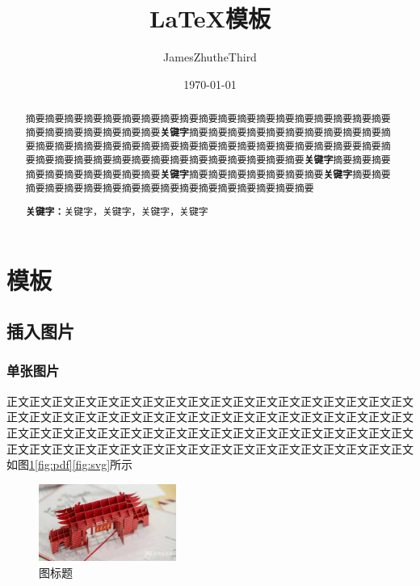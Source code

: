 \documentclass[a4paper]{article}
\title{\LaTeX 模板}
\author{JamesZhutheThird}
\date{\today}
\begin{document}
\thispagestyle{fancy}
\maketitle

\begin{abstract}
摘要摘要摘要摘要摘要摘要摘要摘要摘要摘要摘要摘要摘要摘要摘要摘要摘要摘要摘要摘要摘要摘要摘要摘要摘要摘要\textbf{关键字}摘要摘要摘要摘要摘要摘要摘要摘要摘要摘要摘要摘要摘要摘摘要摘要摘要摘要摘要摘要摘要摘要摘要摘要摘要摘要摘要摘要要摘要摘要摘要摘要摘要摘要摘要摘要摘要摘要摘要摘要摘要摘要摘要摘要\textbf{关键字}摘要摘要摘要摘要摘要摘要摘要摘要摘要摘要\textbf{关键字}摘要摘要摘要摘要摘要摘要摘要\textbf{关键字}摘要摘要摘要摘要摘要摘要摘要摘要摘要摘要摘要摘要摘要摘要摘要摘要摘要
\par\textbf{关键字：}关键字，关键字，关键字，关键字
\end{abstract}


\section{模板}
\subsection{插入图片}
\subsubsection{单张图片}
正文正文正文正文正文正文正文正文\cite{doi:10.5772/4740}正文正文正文正文正文正文正文正文正文正文正文正文正文正文正文正文正文正文正文正文正文正文正文正文正文正文正文正文正文正文正文正文正文正文正文正文正文正文正文正文正文正文正文正文正文正文正文正文正文正文正文正文正文正文正文正文正文正文正文正文正文正文正文正文如图\ref{fig:single}\ref{fig:pdf}\ref{fig:svg}所示

\begin{figure}[!h]
	\centering
	\vspace{0cm}
	\includegraphics[width=0.4\textwidth,trim=50 100 200 75,clip]{figures/fig1.jpg}%
	\vspace{0cm}
	\caption{图标题}
	\label{fig:single}
\end{figure}
\end{document}
